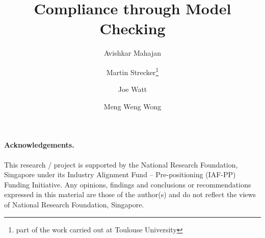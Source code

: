\documentclass[runningheads]{llncs}
\begin{document}


\title{Compliance through Model Checking}

\author{
Avishkar Mahajan \and
Martin Strecker\thanks{part of the work carried out at Toulouse University}
\and
Joe Watt \and
Meng Weng Wong
}


\maketitle

\begin{abstract}

\end{abstract}









\paragraph{Acknowledgements.}
This research / project is supported by the National Research Foundation,
Singapore under its Industry Alignment Fund – Pre-positioning (IAF-PP) Funding
Initiative. Any opinions, findings and conclusions or recommendations
expressed in this material are those of the author(s) and do not reflect the
views of National Research Foundation, Singapore.

% 



% 
% 
% 
% 
\end{document}
